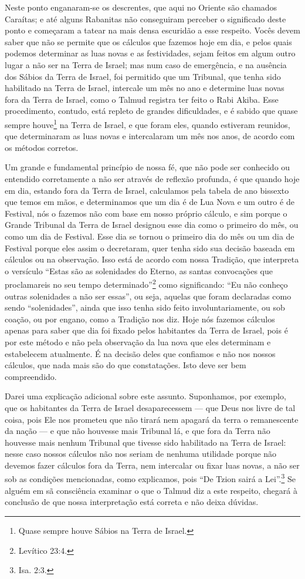 Neste ponto enganaram-se os descrentes, que aqui no Oriente são chamados
Caraítas; e até alguns Rabanitas não conseguiram perceber o significado
deste ponto e começaram a tatear na mais densa escuridão a esse
respeito. Vocês devem saber que não se permite que os cálculos que
fazemos hoje em dia, e pelos quais podemos determinar as luas novas e as
festividades, sejam feitos em algum outro lugar a não ser na Terra de
Israel; mas num caso de emergência, e na ausência dos Sábios da Terra
de Israel, foi permitido que um Tribunal, que tenha sido habilitado na Terra de Israel, intercale um mês no ano
e determine luas novas fora da Terra de Israel, como o Talmud registra
ter feito o Rabi Akiba. Esse procedimento, contudo, está repleto de grandes
dificuldades, e é sabido que quase sempre houve\footnote{Quase sempre houve Sábios na Terra de Israel.} na Terra de
Israel, e que foram eles, quando estiveram reunidos, que determinaram as luas novas e intercalaram um mês nos anos, de acordo com os métodos corretos.

Um grande e fundamental princípio de nossa fé, que não pode ser
conhecido ou entendido corretamente a não ser através de reflexão
profunda, é que quando hoje em dia, estando fora da Terra de Israel,
calculamos pela tabela de ano bissexto que temos em mãos, e
determinamos que um dia é de Lua Nova e um outro é de Festival, nós o
fazemos não com base em nosso próprio cálculo, e sim porque o Grande
Tribunal da Terra de Israel designou esse dia como o primeiro do mês, ou
como um dia de Festival. Esse dia se tornou o primeiro dia do mês ou um
dia de Festival porque eles assim o decretaram, quer tenha sido sua
decisão baseada em cálculos ou na observação. Isso está de acordo com
nossa Tradição, que interpreta o versículo ``Estas são as solenidades do
Eterno, as santas convocações que proclamareis no seu tempo
determinado''\footnote{Levítico 23:4.} como significando: ``Eu não conheço outras
solenidades a não ser essas'', ou seja, aquelas que foram declaradas
como sendo ``solenidades'', ainda que isso tenha sido feito
involuntariamente, ou sob coação, ou por engano, como a Tradição nos
diz. Hoje nós fazemos cálculos apenas para saber que dia foi fixado
pelos habitantes da Terra de Israel, pois é por este método e não pela
observação da lua nova que eles determinam e estabelecem atualmente. É
na decisão deles que confiamos e não nos nossos cálculos, que nada mais
são do que constatações. Isto deve ser bem compreendido.

Darei uma explicação adicional sobre este assunto. Suponhamos, por
exemplo, que os habitantes da Terra de Israel desaparecessem --- que
Deus nos livre de tal coisa, pois Ele nos prometeu que não tirará nem
apagará da terra o remanescente da nação --- e que não houvesse mais
Tribunal lá, e que fora da Terra não houvesse mais nenhum Tribunal que
tivesse sido habilitado na Terra de Israel: nesse caso nossos cálculos
não nos seriam de nenhuma utilidade porque não devemos fazer cálculos fora da Terra, nem intercalar ou fixar luas novas, a não
ser sob as condições mencionadas, como explicamos, pois ``De Tzion sairá
a Lei''.\footnote{Isa. 2:3.} Se alguém em sã consciência examinar o
que o Talmud diz a este respeito, chegará à conclusão de que nossa
interpretação está correta e não deixa dúvidas.

